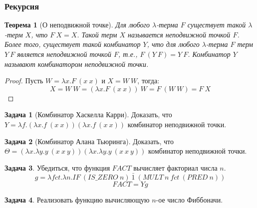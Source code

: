 \documentclass[10pt,twoside]{article}
\theoremstyle{plain}
\newtheorem{thm}{Теорема}
\theoremstyle{definition}
\newtheorem{problem}{Задача}
\begin{document}
\subsubsection{Рекурсия}

\begin{thm}[О неподвижной точке]
  Для любого $\lambda$-терма $F$ существует такой $\lambda$-терм $X$, что $F\ X = X$. Такой терм $X$ называется неподвижной точкой $F$. Более того, существует такой комбинатор $Y$, что для любого $\lambda$-терма $F$ терм $Y\ F$ является неподвижной точкой $F$, т.е., $F\ (Y\ F) = Y\ F$. Комбинатор $Y$ называют комбинатором неподвижной точки.
\end{thm}

\begin{proof}
  Пусть $W = \lambda x.F\ (x\ x)$ и $X = W\ W$, тогда: $$X = W\ W = (\lambda x.F\ (x\ x))\ W = F\ (W\ W) = F\ X$$
\end{proof}

\begin{problem}[Комбинатор Хаскелла Карри]
  Доказать, что $Y = \lambda f.(\lambda x.f\ (x\ x))(\lambda x.f\ (x\ x))$ комбинатор неподвижной точки.
\end{problem}

\begin{problem}[Комбинатор Алана Тьюринга]
  Доказать, что $\Theta = (\lambda x.\lambda y.y\ (x\ x\ y))(\lambda x.\lambda y.y\ (x\ x\ y))$ комбинатор неподвижной точки.
\end{problem}

\begin{problem}
  Убедиться, что функция $FACT$ вычисляет факториал числа $n$.
  $$g = \lambda fct.\lambda n.IF\ (IS\_ZERO\ n)\ \bar 1\ (MULT\ n\ fct\ (PRED\ n))$$
  $$FACT = Y g$$
\end{problem}

\begin{problem}
  Реализовать функцию вычисляющую $n$-ое число Фиббоначи.
\begin{comment}
    $$g = \lambda fib.\lambda n.IF\ (IS\_ZERO\ n)\ \bar 0\ (IF\ (EQ\ n\ \bar 1)\ \bar 1\ (PLUS\ (fib\ (PRED\ n))\ (fib\ (MINUS\ n\ \bar 2)))$$
    $$FIB = Y g$$
\end{comment}
\end{problem}
\end{document}
